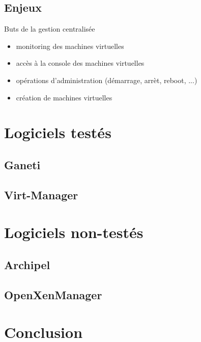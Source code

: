 \documentclass{beamer}
\begin{document}
\subsection{Enjeux}
\begin{frame}{Buts de la gestion centralisée}
\begin{center}
\begin{itemize}
\item  monitoring des machines virtuelles
\pause
\item accès à la console des machines virtuelles
\pause
\item opérations d'administration (démarrage, arrèt, reboot, ...)
\pause
\item création de machines virtuelles
\end{itemize}
\end{center}
\end{frame}

\section{Logiciels testés}
\subsection{Ganeti}

\subsection{Virt-Manager}

\section{Logiciels non-testés}

\subsection{Archipel}


\subsection{OpenXenManager}



\section{Conclusion}
\end{document}
